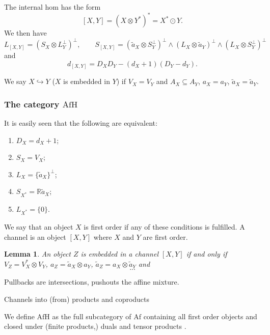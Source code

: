 \documentclass[12pt]{article}
\newtheorem{lemma}{Lemma}
\theoremstyle{definition}
\theoremstyle{remark}
\def \Afh{\mathrm{AfH}}
\def \Af{\mathrm{Af}}
\begin{document}
The internal hom has the form
\[
[X,Y]=(X\otimes Y^*)^*=X^*\odot Y.
\]
We then have
\[
L_{[X,Y]}=(S_X\otimes L_Y^\perp)^\perp,\qquad S_{[X,Y]}=(\tilde a_X\otimes
S_Y^\perp)^\perp\wedge(L_X\otimes \tilde a_Y)^\perp\wedge (L_X\otimes
S_Y^\perp)^\perp
\]
and
\[
d_{[X,Y]}=D_XD_Y-(d_X+1)(D_Y-d_Y).
\]

We say $X\hookrightarrow Y$ ($X$ is embedded in $Y$) if  $V_X=V_Y$ and $A_X\subseteq A_Y$,
$a_X=a_Y$, $\tilde a_X=\tilde a_Y$.


\subsubsection{The category $\Afh$} 


It is easily seen that the following are equivalent:
\begin{enumerate}
\item $D_X=d_X+1$;
\item $S_X=V_X$;
\item $L_X=\{\tilde a_X\}^\perp$;
\item $S_{X^*}=\mathbb R \tilde a_X$;
\item $L_{X^*}=\{0\}$.
\end{enumerate}
We say that an object $X$ is first order if any of these conditions is fulfilled. A
channel is an object $[X,Y]$ where  $X$ and $Y$ are first order.

\begin{lemma}\label{lemma:channels} An object $Z$ is embedded in  a channel  $[X,Y]$ if
and only if $V_Z=V_{X}^*\otimes V_Y$, $a_Z=\tilde a_X\otimes a_Y$, $\tilde a_Z=a_X\otimes
\tilde a_Y$ and 
\[
...
\]

\end{lemma}

Pullbacks are intersections, pushouts the affine mixture.

Channels into (from) products and coproducts

We define $\Afh$ as the full subcategory of $\Af$ containing all first order objects and
closed under (finite products,) duals and  tensor products . 
\end{document}
